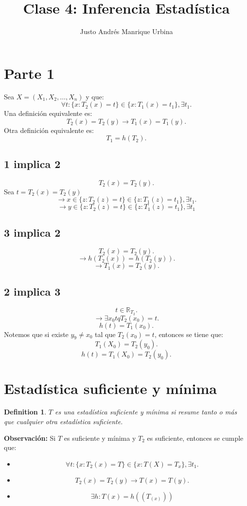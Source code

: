 \documentclass{article}
\title{Clase 4: Inferencia Estadística}
\author{Justo Andrés Manrique Urbina}
\newtheorem{mydef}{Definition}
\begin{document}
\maketitle
\section{Parte 1}
Sea $X=(X_{1},X_{2},\ldots,X_{n})$ y que:
\[ \forall t: \{ x: T_{2}{(x)}=t\} \in \{x: T_{1}{(x)}=t_{1}\}, \exists t_{1}.\]
Una definición equivalente es:
\[ T_{2}{(x)}=T_{2}{(y)} \rightarrow T_{1}{(x)}=T_{1}{(y)}.\]
Otra definición equivalente es:
\[ T_{1}=h{(T_{2})}.\]

\subsection{1 implica 2}
\[ T_{2}{(x)}=T_{2}{(y)}.\]
Sea $t=T_{2}{(x)}=T_{2}{(y)}$
\[ \rightarrow x \in \{z:T_{2}(z)=t\}\in \{z:T_{1}{(z)}=t_{1}\},\exists t_{1}.\]
\[ \rightarrow y \in \{z:T_{2}{(z)}=t\} \in \{z: T_{1}{(z)}=t_{1}\},\exists t_{1}\]
\subsection{3 implica 2}
\[ T_{2}{(x)}=T_{2}{(y)}.\]
\[ \rightarrow h(T_{2}{(x)})=h{(T_{2}{(y)})}.\]
\[ \rightarrow T_{1}{(x)}=T_{2}{(y)}.\]

\subsection{2 implica 3}
\[ t \in \mathbb{R}_{T_{2}}.\]
\[ \rightarrow \exists x_{0} tq T_{2}{(x_{0})}=t.\]
\[ h(t)=T_{1}{(x_{0})}.\]
Notemos que si existe $y_{9}\neq x_{0}$ tal que $T_{2}{(x_{0})}=t$, entonces se tiene que:
\[ T_{1}{(X_{0})}=T_{2}{(y_{0})}.\]
\[ h{(t)}=T_{1}{(X_{0})}=T_{2}{(y_{0})}.\]

\section{Estadística suficiente y mínima}
\begin{mydef}
$T$ es una estadística suficiente y mínima  si resume tanto o más que cualquier otra estadística suficiente.
\end{mydef}

\textbf{Observación: }Si $T$ es suficiente y mínima y $T_{2}$ es suficiente, entonces se cumple que:
\begin{itemize}
	\item \[ \forall t:\{x:T_{2}{(x)}=T\} \in \{x:T(X)=T_{x}\}, \exists t_{1}.\]
	\item \[ T_{2}{(x)}=T_{2}{(y)}\rightarrow T{(x)}=T{(y)}.\]
	\item  \[\exists h: T{(x)}=h{({(T_{{(x)}})})}\]
\end{itemize}
\end{document}
